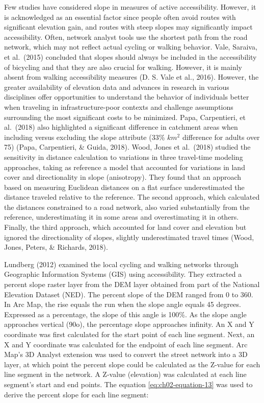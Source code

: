 \documentclass[
11pt, %
oneside, %
english, %
singlespacing, %
]{macthesis} %
\begin{document}
Few studies have considered slope in measures of active accessibility. However, it is acknowledged as an essential factor since people often avoid routes with significant elevation gain, and routes with steep slopes may significantly impact accessibility. Often, network analyst tools use the shortest path from the road network, which may not reflect actual cycling or walking behavior. Vale, Saraiva, et al.~(2015) concluded that slopes should always be included in the accessibility of bicycling and that they are also crucial for walking. However, it is mainly absent from walking accessibility measures (D. S. Vale et al., 2016). However, the greater availability of elevation data and advances in research in various disciplines offer opportunities to understand the behavior of individuals better when traveling in infrastructure-poor contexts and challenge assumptions surrounding the most significant costs to be minimized. Papa, Carpentieri, et al.~(2018) also highlighted a significant difference in catchment areas when including versus excluding the slope attribute (33\% \(km^2\) difference for adults over 75) (Papa, Carpentieri, \& Guida, 2018). Wood, Jones et al.~(2018) studied the sensitivity in distance calculation to variations in three travel-time modeling approaches, taking as reference a model that accounted for variations in land cover and directionality in slope (anisotropy). They found that an approach based on measuring Euclidean distances on a flat surface underestimated the distance traveled relative to the reference. The second approach, which calculated the distances constrained to a road network, also varied substantially from the reference, underestimating it in some areas and overestimating it in others. Finally, the third approach, which accounted for land cover and elevation but ignored the directionality of slopes, slightly underestimated travel times (Wood, Jones, Peters, \& Richards, 2018).

Lundberg (2012) examined the local cycling and walking networks through Geographic Information Systems (GIS) using accessibility. They extracted a percent slope raster layer from the DEM layer obtained from part of the National Elevation Dataset (NED). The percent slope of the DEM ranged from 0 to 360. In Arc Map, the rise equals the run when the slope angle equals 45 degrees. Expressed as a percentage, the slope of this angle is 100\%. As the slope angle approaches vertical (90o), the percentage slope approaches infinity. An X and Y coordinate was first calculated for the start point of each line segment. Next, an X and Y coordinate was calculated for the endpoint of each line segment. Arc Map's 3D Analyst extension was used to convert the street network into a 3D layer, at which point the percent slope could be calculated as the Z-value for each line segment in the network. A Z-value (elevation) was calculated at each line segment's start and end points. The equation \ref{eq:ch02-equation-13} was used to derive the percent slope for each line segment:
\end{document}
